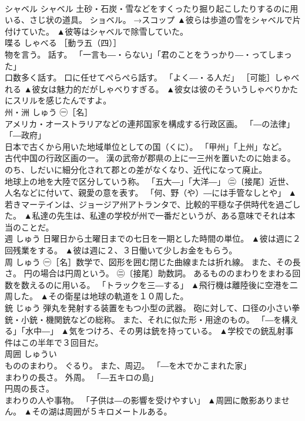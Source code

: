 \documentclass[8pt]{extreport}
\begin{document}
\begin{CJK}{UTF8}{min}
\\	シャベル	シャベル	土砂・石炭・雪などをすくったり掘り起こしたりするのに用いる、さじ状の道具。 ショベル。 →スコップ	▲彼らは歩道の雪をシャベルで片付けていた。 ▲彼等はシャベルで除雪していた。
\\	喋る	しゃべる	［動ラ五（四）］ 
\\	物を言う。 話す。 「一言も―・らない」「君のことをうっかり―・ってしまった」 
\\	口数多く話す。 口に任せてぺらぺら話す。 「よく―・る人だ」 ［可能］しゃべれる	▲彼女は魅力的だがしゃべりすぎる。 ▲彼女は彼のそういうしゃべりかたにスリルを感じたんですよ。
\\	州・洲	しゅう	㊀［名］ 
\\	アメリカ・オーストラリアなどの連邦国家を構成する行政区画。 「―の法律」「―政府」 
\\	日本で古くから用いた地域単位としての国（くに）。 「甲州」「上州」など。 
\\	古代中国の行政区画の一。 漢の武帝が郡県の上に一三州を置いたのに始まる。 のち、しだいに細分化されて郡との差がなくなり、近代になって廃止。 
\\	地球上の地を大陸で区分していう称。 「五大―」「大洋―」 ㊁〔接尾〕近世、人名などに付いて、親愛の意を表す。 「何、野（や）―には手管なしとや」	▲若きマーテインは、ジョージア州アトランタで、比較的平穏な子供時代を過ごした。 ▲私達の先生は、私達の学校が州で一番だというが、ある意味でそれは本当のことだ。
\\	週	しゅう	日曜日から土曜日までの七日を一期とした時間の単位。	▲彼は週に２回残業をする。 ▲彼は週に２、３日働いて少しお金をもらう。
\\	周	しゅう	㊀［名］数学で、図形を囲む閉じた曲線または折れ線。 また、その長さ。 円の場合は円周という。 ㊁〔接尾〕助数詞。 あるもののまわりをまわる回数を数えるのに用いる。 「トラックを三―する」	▲飛行機は離陸後に空港を二周した。 ▲その衛星は地球の軌道を１０周した。
\\	銃	じゅう	弾丸を発射する装置をもつ小型の武器。 砲に対して、口径の小さい拳銃・小銃・機関銃などの総称。 また、それに似た形・用途のもの。 「―を構える」「水中―」	▲気をつけろ、その男は銃を持っている。 ▲学校での銃乱射事件はこの半年で３回目だ。
\\	周囲	しゅうい	
\\	もののまわり。 ぐるり。 また、周辺。 「―を木でかこまれた家」 
\\	まわりの長さ。 外周。 「―五キロの島」 
\\	円周の長さ。 
\\	まわりの人や事物。 「子供は―の影響を受けやすい」	▲周囲に敵影ありません。 ▲その湖は周囲が５キロメートルある。

\end{CJK}
\end{document}
